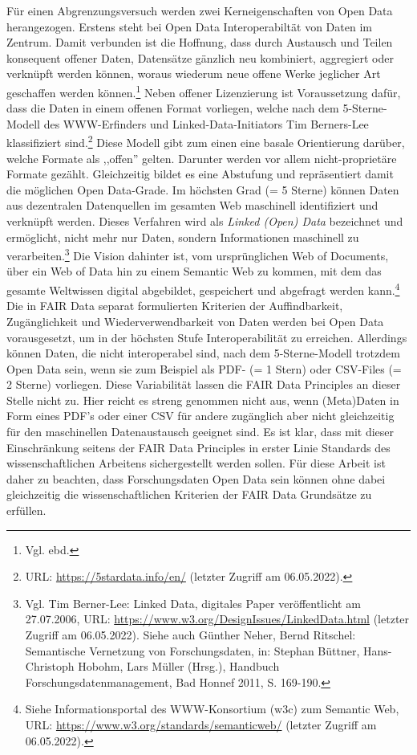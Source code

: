 Für einen Abgrenzungsversuch werden zwei Kerneigenschaften von Open Data herangezogen. Erstens steht bei Open Data Interoperabiltät von Daten im Zentrum. Damit verbunden ist die Hoffnung, dass durch Austausch und Teilen konsequent offener Daten, Datensätze gänzlich neu kombiniert, aggregiert oder verknüpft werden können, woraus wiederum neue offene Werke jeglicher Art geschaffen werden können.\footnote{Vgl. ebd.} Neben offener Lizenzierung ist Voraussetzung dafür, dass die Daten in einem offenen Format vorliegen, welche nach dem 5-Sterne-Modell des WWW-Erfinders und Linked-Data-Initiators Tim Berners-Lee klassifiziert sind.\footnote{URL: \url{https://5stardata.info/en/} (letzter Zugriff am 06.05.2022).} Diese Modell gibt zum einen eine basale Orientierung darüber, welche Formate als ,,offen'' gelten. Darunter werden vor allem nicht-proprietäre Formate gezählt. Gleichzeitig bildet es eine Abstufung und repräsentiert damit die möglichen Open Data-Grade. Im höchsten Grad (= 5 Sterne) können Daten aus dezentralen Datenquellen im gesamten Web maschinell identifiziert und verknüpft werden. Dieses Verfahren wird als \textit{Linked (Open) Data} bezeichnet und ermöglicht, nicht mehr nur Daten, sondern Informationen maschinell zu verarbeiten.\footnote{Vgl. Tim Berner-Lee: Linked Data, digitales Paper veröffentlicht am 27.07.2006, URL: \url{https://www.w3.org/DesignIssues/LinkedData.html} (letzter Zugriff am 06.05.2022). Siehe auch Günther Neher, Bernd Ritschel: Semantische Vernetzung von Forschungsdaten, in: Stephan Büttner, Hans-Christoph Hobohm, Lars Müller (Hrsg.), Handbuch Forschungsdatenmanagement, Bad Honnef 2011, S. 169-190.} Die Vision dahinter ist, vom ursprünglichen Web of Documents, über ein Web of Data hin zu einem Semantic Web zu kommen, mit dem das gesamte Weltwissen digital abgebildet, gespeichert und abgefragt werden kann.\footnote{Siehe Informationsportal des WWW-Konsortium (w3c) zum Semantic Web, URL: \url{https://www.w3.org/standards/semanticweb/} (letzter Zugriff am 06.05.2022).} Die in FAIR Data separat formulierten Kriterien der Auffindbarkeit, Zugänglichkeit und Wiederverwendbarkeit von Daten werden bei Open Data vorausgesetzt, um in der höchsten Stufe Interoperabilität zu erreichen. Allerdings können Daten, die nicht interoperabel sind, nach dem 5-Sterne-Modell trotzdem Open Data sein, wenn sie zum Beispiel als PDF- (= 1 Stern) oder CSV-Files (= 2 Sterne) vorliegen. Diese Variabilität lassen die FAIR Data Principles an dieser Stelle nicht zu. Hier reicht es streng genommen nicht aus, wenn (Meta)Daten in Form eines PDF's oder einer CSV für andere zugänglich aber nicht gleichzeitig für den maschinellen Datenaustausch geeignet sind. Es ist klar, dass mit dieser Einschränkung seitens der FAIR Data Principles in erster Linie Standards des wissenschaftlichen Arbeitens sichergestellt werden sollen. Für diese Arbeit ist daher zu beachten, dass Forschungsdaten Open Data sein können ohne dabei gleichzeitig die wissenschaftlichen Kriterien der FAIR Data Grundsätze zu erfüllen.

